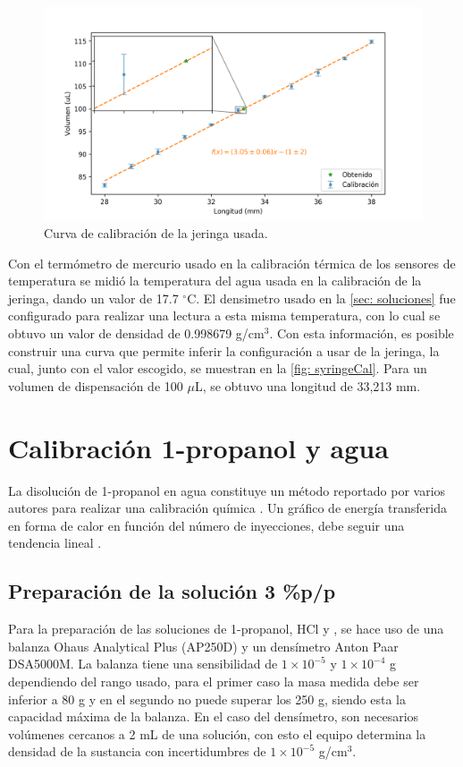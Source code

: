 	\begin{figure}[h!]
		\centering
		\includegraphics[width=\linewidth]{../Data/Syringe/syringe_cal.png}
		\caption{Curva de calibraci\'on de la jeringa usada.}
		\label{fig: syringeCal}
	\end{figure}
	
	Con el termómetro de mercurio usado en la calibración térmica de los sensores de temperatura se midió la temperatura del agua usada en la calibración de la jeringa, dando un valor de 17.7 $^\circ$C. El densimetro usado en la \autoref{sec: soluciones} fue configurado para realizar una lectura a esta misma temperatura, con lo cual se obtuvo un valor de densidad de 0.998679 g/cm$^3$. Con esta información, es posible construir una curva que permite inferir la configuración a usar de la jeringa, la cual, junto con el valor escogido, se muestran en la \autoref{fig: syringeCal}. Para un volumen de dispensación de 100 $\mu$L, se obtuvo una longitud de 33,213 mm.	

\section{Calibraci\'on 1-propanol y agua}
	La disoluci\'on de 1-propanol en agua constituye un m\'etodo reportado por varios autores para realizar una calibraci\'on qu\'imica \cite{briggner1991test, nanoitc, demarse2011calibration, adao2012chemical}. Un gr\'afico de energ\'ia transferida en forma de calor en funci\'on del n\'umero de inyecciones, debe seguir una tendencia lineal \cite{demarse2011calibration, nanoitc, adao2012chemical}. 
	
\subsection{Preparaci\'on de la soluci\'on 3 \%p/p}
	Para la preparaci\'on de las soluciones de 1-propanol, HCl y , se hace uso de una balanza Ohaus Analytical Plus (AP250D) y un dens\'imetro Anton Paar DSA5000M. La balanza tiene una sensibilidad de $1\times10^{-5}$ y $1\times10^{-4}$ g dependiendo del rango usado, para el primer caso la masa medida debe ser inferior a 80 g y en el segundo no puede superar los 250 g, siendo esta la capacidad máxima de la balanza. En el caso del densímetro, son necesarios volúmenes cercanos a 2 mL de una soluci\'on, con esto el equipo determina la densidad de la sustancia con incertidumbres de $1\times10^{-5}$ g/cm$^{3}$.

